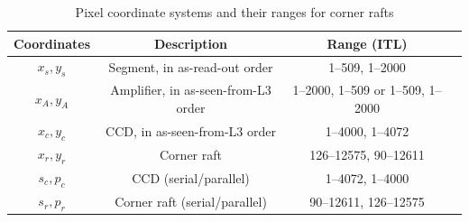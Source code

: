 \documentclass{article}[12pt]
\begin{document}
{\begin{table}
\begin{centering}
\begin{tabular}{| c | c | c | c |}
\hline
{\bf Coordinates} & {\bf Description} & {\bf Range (ITL)}  \\
\hline
$x_s, y_s$ & Segment, in as-read-out order &  1--509, 1--2000  \\
$x_A, y_A$ & Amplifier, in as-seen-from-L3 order & 1--2000, 1--509 or 1--509, 1--2000 \\
$x_c, y_c$ & CCD, in as-seen-from-L3 order &  1--4000, 1--4072  \\
$x_r, y_r$ & Corner raft &  126--12575, 90--12611 \\
$s_c, p_c$ & CCD (serial/parallel) & 1--4072, 1--4000 \\
$s_r, p_r$ & Corner raft (serial/parallel) & 90--12611, 126--12575 \\
\hline
\end{tabular}
\caption{Pixel coordinate systems and their ranges for corner rafts \label{tab:cr_coords}}
\end{centering}
\end{table}


}
\end{document}
